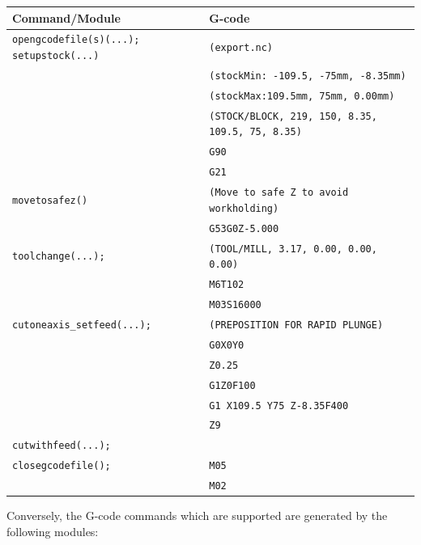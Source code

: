 \documentclass{ltxdoc}
\begin{document}
\noindent \begin{tabular}{@{}ll@{}} \toprule
 Command/Module                    & G-code                                        \\ \midrule
 \texttt{opengcodefile(s)(...);}
 \texttt{setupstock(...)}          & \texttt{(export.nc)}                          \\
                                   & \texttt{(stockMin: -109.5, -75mm, -8.35mm)}\\
                                   & \texttt{(stockMax:109.5mm, 75mm, 0.00mm)}\\
                                   & \texttt{(STOCK/BLOCK, 219, 150, 8.35, 109.5, 75, 8.35)}\\
                                   & \texttt{G90}\\
                                   & \texttt{G21} \\ \midrule
 \texttt{movetosafez()}            & \texttt{(Move to safe Z to avoid workholding)}\\
                                   & \texttt{G53G0Z-5.000}\\ \midrule
 \texttt{toolchange(...);}         & \texttt{(TOOL/MILL, 3.17, 0.00, 0.00, 0.00)} \\
                                   & \texttt{M6T102} \\
                                   & \texttt{M03S16000} \\ \midrule
 \verb|cutoneaxis_setfeed(...);|   & \texttt{(PREPOSITION FOR RAPID PLUNGE)}\\
  & \texttt{G0X0Y0} \\
  & \texttt{Z0.25} \\
  & \texttt{G1Z0F100} \\
  & \texttt{G1 X109.5 Y75 Z-8.35F400} \\
  & \texttt{Z9}\\
 \texttt{cutwithfeed(...);}\\ \midrule

 \texttt{closegcodefile();}        & \texttt{M05}\\
                                   & \texttt{M02}\\ 
\bottomrule
\end{tabular}
\bigskip

\noindent Conversely, the G-code commands which are supported are generated by the following modules:

\bigskip
\end{document}
